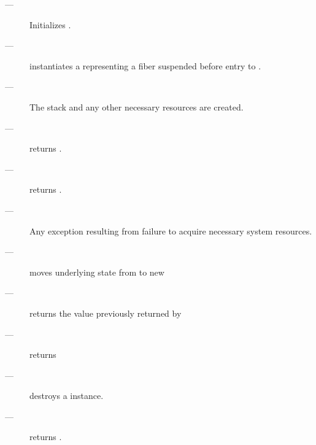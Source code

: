 \effects
\begin{description}
    \item[---] Initializes .
    \item[---] instantiates a \fiber representing a fiber suspended before
              entry to .
    \item[---] The stack and any other necessary resources are created.
\end{description}

\postcond
\begin{description}
    \item[---]  returns .
    \item[---]  returns .
\end{description}

\except
\begin{description}
    \item[---] Any exception resulting from failure to acquire necessary
               system resources.
\end{description}


\effects
\begin{description}
    \item[---] moves underlying state from  to new \fiber
\end{description}

\postcond
\begin{description}
    \item[---]  returns the value previously returned by 
    \item[---]  returns 
\end{description}


\effects
\begin{description}
    \item[---] destroys a \fiber instance.
\end{description}

\requires
\begin{description}
    \item[---]  returns .
\end{description}

